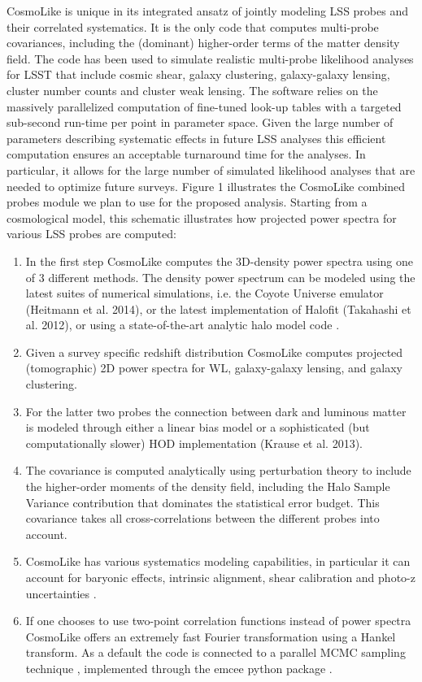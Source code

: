 CosmoLike is unique in its integrated ansatz of jointly modeling LSS probes and their correlated systematics. It is the only code that computes multi-probe covariances, including the (dominant) higher-order terms of the matter density field. The code has been used to simulate realistic multi-probe likelihood analyses for LSST \citep{Krause2017} that include cosmic shear, galaxy clustering, galaxy-galaxy lensing, cluster number counts and cluster weak lensing. 
The software relies on the massively parallelized computation of fine-tuned look-up tables with a targeted sub-second run-time per point in parameter space. Given the large number of parameters describing systematic effects in future LSS analyses this efficient computation ensures an acceptable turnaround time for the analyses. In particular, it allows for the large number of simulated likelihood analyses that are needed to optimize future surveys. Figure 1 illustrates the CosmoLike combined probes module we plan to use for the proposed analysis. Starting from a cosmological model, this schematic illustrates how projected power spectra for various LSS probes are computed: 
\begin{enumerate}
\item In the first step CosmoLike computes the 3D-density power spectra using one of 3 different methods. The density power spectrum can be modeled using the latest suites of numerical simulations, i.e. the Coyote Universe emulator (Heitmann et al. 2014), or the latest implementation of Halofit (Takahashi et al. 2012), or using a state-of-the-art analytic halo model code \citep{Krause2013}. 
\item Given a survey specific redshift distribution CosmoLike computes projected (tomographic) 2D power spectra for WL, galaxy-galaxy lensing, and galaxy clustering.
\item  For the latter two probes the connection between dark and luminous matter is modeled through either a linear bias model or a sophisticated (but computationally slower) HOD implementation (Krause et al. 2013).
\item The covariance is computed analytically using perturbation theory to include the higher-order moments of the density field, including the Halo Sample Variance contribution that dominates the statistical error budget. This covariance takes all cross-correlations between the different probes into account. 
\item CosmoLike has various systematics modeling capabilities, in particular it can account for baryonic effects, intrinsic alignment, shear calibration and photo-z uncertainties \citep{Eifler2015, Krause2016, Krause2017}. 
\item If one chooses to use two-point correlation functions instead of power spectra CosmoLike offers an extremely fast Fourier transformation using a Hankel transform. As a default the code is connected to a parallel MCMC sampling technique \citep{Goodman2010}, implemented through the emcee python package \citep{Foreman-Mackey2013}.
\end{enumerate}

